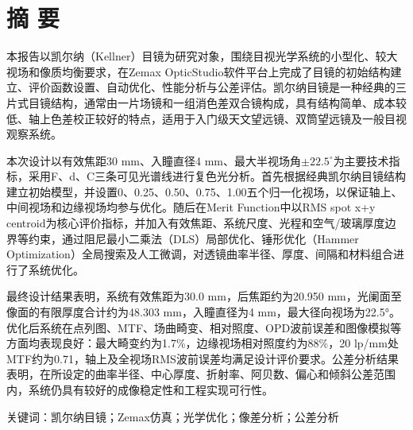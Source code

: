 \section*{摘 要}

本报告以凯尔纳（Kellner）目镜为研究对象，围绕目视光学系统的小型化、较大视场和像质均衡要求，在Zemax OpticStudio软件平台上完成了目镜的初始结构建立、评价函数设置、自动优化、性能分析与公差评估。凯尔纳目镜是一种经典的三片式目镜结构，通常由一片场镜和一组消色差双合镜构成，具有结构简单、成本较低、轴上色差校正较好的特点，适用于入门级天文望远镜、双筒望远镜及一般目视观察系统。

本次设计以有效焦距30 mm、入瞳直径4 mm、最大半视场角\(\pm 22.5^\circ\)为主要技术指标，采用F、d、C三条可见光谱线进行复色光分析。首先根据经典凯尔纳目镜结构建立初始模型，并设置0、0.25、0.50、0.75、1.00五个归一化视场，以保证轴上、中间视场和边缘视场均参与优化。随后在Merit Function中以RMS spot x+y centroid为核心评价指标，并加入有效焦距、系统尺度、光程和空气/玻璃厚度边界等约束，通过阻尼最小二乘法（DLS）局部优化、锤形优化（Hammer Optimization）全局搜索及人工微调，对透镜曲率半径、厚度、间隔和材料组合进行了系统优化。

最终设计结果表明，系统有效焦距为30.0 mm，后焦距约为20.950 mm，光阑面至像面的有限厚度合计约为48.303 mm，入瞳直径为4 mm，最大径向视场为22.5°。优化后系统在点列图、MTF、场曲畸变、相对照度、OPD波前误差和图像模拟等方面均表现良好：最大畸变约为1.7\%，边缘视场相对照度约为88\%，20 lp/mm处MTF约为0.71，轴上及全视场RMS波前误差均满足设计评价要求。公差分析结果表明，在所设定的曲率半径、中心厚度、折射率、阿贝数、偏心和倾斜公差范围内，系统仍具有较好的成像稳定性和工程实现可行性。

关键词：凯尔纳目镜；Zemax仿真；光学优化；像差分析；公差分析
